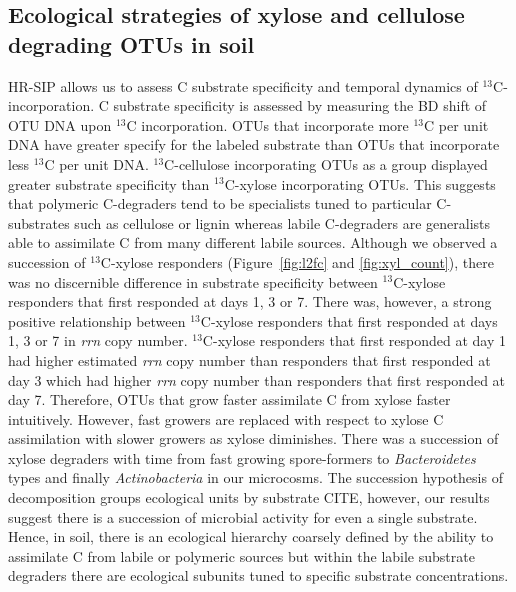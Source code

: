 \subsection{Ecological strategies of xylose and cellulose degrading OTUs in soil}
HR-SIP allows us to assess C substrate specificity and temporal dynamics of
$^{13}$C-incorporation. C substrate specificity is assessed by measuring the 
BD shift of OTU DNA upon $^{13}$C incorporation. OTUs that incorporate more
$^{13}$C per unit DNA have greater specify for the labeled substrate than
OTUs that incorporate less $^{13}$C per unit DNA. $^{13}$C-cellulose 
incorporating OTUs as a group displayed greater substrate specificity than
$^{13}$C-xylose incorporating OTUs. This suggests that polymeric C-degraders
tend to be specialists tuned to particular C-substrates such as cellulose
or lignin whereas labile C-degraders are generalists able to assimilate
C from many different labile sources. Although we observed a succession of 
$^{13}$C-xylose responders (Figure~\ref{fig:l2fc} and \ref{fig:xyl_count}), 
there was no discernible difference in substrate specificity between 
$^{13}$C-xylose responders that first responded at days 1, 3 or 7. There was,
however, a strong positive relationship between $^{13}$C-xylose responders that
first responded at days 1, 3 or 7 in \textit{rrn} copy number. $^{13}$C-xylose 
responders that first responded at day 1 had higher estimated \textit{rrn} copy 
number than responders that first responded at day 3 which had higher
\textit{rrn} copy number than responders that first responded at day 7.
Therefore, OTUs that grow faster assimilate C from xylose faster intuitively.
However, fast growers are replaced with respect to xylose C assimilation with
slower growers as xylose diminishes. There was a succession of xylose degraders
with time from fast growing spore-formers to \textit{Bacteroidetes} types and
finally \textit{Actinobacteria} in our microcosms. The succession hypothesis of
decomposition groups ecological units by substrate CITE, however, our results
suggest there is a succession of microbial activity for even a single
substrate. Hence, in soil, there is an ecological hierarchy coarsely defined by
the ability to assimilate C from labile or polymeric sources but within the
labile substrate degraders there are ecological subunits tuned to specific
substrate concentrations.















